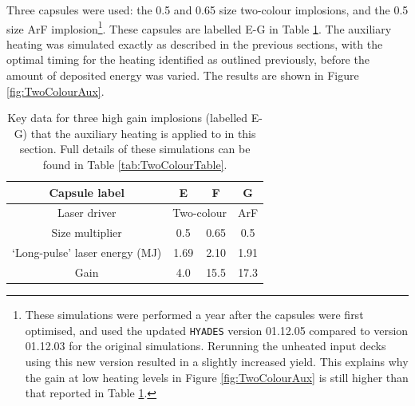 Three capsules were used: the 0.5 and 0.65 size two-colour implosions, and the 0.5 size ArF implosion\footnote{These simulations were performed a year after the capsules were first optimised, and used the updated \texttt{HYADES} version 01.12.05 compared to version 01.12.03 for the original simulations. Rerunning the unheated input decks using this new version resulted in a slightly increased yield. This explains why the gain at low heating levels in Figure \ref{fig:TwoColourAux} is still higher than that reported in Table \ref{tab:Heating two colour capsules}.}.  These capsules are labelled E-G in Table \ref{tab:Heating two colour capsules}. The auxiliary heating was simulated exactly as described in the previous sections, with the optimal timing for the heating identified as outlined previously, before the amount of deposited energy was varied. The results are shown in Figure \ref{fig:TwoColourAux}.

\begin{table}
\centering
\begin{tabular}{|c|c|c|c|}
\hline
Capsule label &  E & F & G  \\ 
\hline
Laser driver & \multicolumn{2}{c|}{Two-colour} & ArF \\ 
\hline
Size multiplier & 0.5 & 0.65 & 0.5 \\
\hline
`Long-pulse' laser energy (MJ) & 1.69  & 2.10 & 1.91 \\ 
Gain & 4.0 & 15.5 & 17.3 \\ 
\hline
  \end{tabular}
  \caption{Key data for three high gain implosions (labelled E-G) that the auxiliary heating is applied to in this section. Full details of these simulations can be found in Table \ref{tab:TwoColourTable}.}
  \label{tab:Heating two colour capsules}
\end{table}

